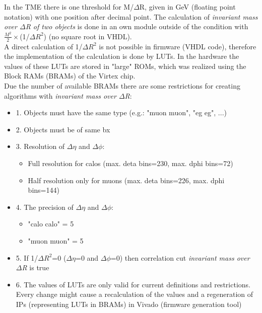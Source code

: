 In the TME there is one threshold for M/$\Delta$R, given in GeV (floating point notation) with one position after decimal point.
The calculation of \textit{invariant mass over $\Delta$R of two objects} is done in an own module outside of the condition with $\frac{M^2}{2}\times$(1/$\Delta$$R^2$) (no square root in VHDL).\\
A direct calculation of 1/$\Delta$$R^2$ is not possible in firmware (VHDL code), therefore the implementation of the calculation is done by LUTs. In the hardware the values of these LUTs are stored in "large" ROMs, which was realized using the Block RAMs (BRAMs) of the Virtex chip.\\
Due the number of available BRAMs there are some restrictions for creating algorithms with \textit{invariant mass over $\Delta$R}:
\begin{itemize}
\item 1. Objects must have the same type (e.g.: "muon muon", "eg eg", ...)
\item 2. Objects must be of same bx
\item 3. Resolution of $\Delta\eta$ and $\Delta\phi$:
  \begin{itemize}
  \item Full resolution for calos (max. deta bins=230, max. dphi bins=72)
  \item Half resolution only for muons (max. deta bins=226, max. dphi bins=144)
  \end{itemize}
\item 4. The precision of $\Delta\eta$ and $\Delta\phi$:
  \begin{itemize}
  \item "calo calo" = 5
  \item "muon muon" = 5
  \end{itemize}
\item 5. If 1/$\Delta$$R^2$=0 ($\Delta\eta$=0 and $\Delta\phi$=0) then correlation cut \textit{invariant mass over $\Delta$R} is true
\item 6. The values of LUTs are only valid for current definitions and restrictions. Every change might cause a recalculation of the values and a regeneration of IPs (representing LUTs in BRAMs) in Vivado (firmware generation tool)
\end{itemize}

